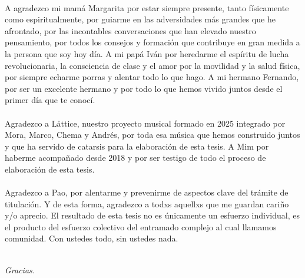 \\
A agradezco mi mamá Margarita por estar siempre presente, tanto físicamente como espiritualmente, por guiarme en las adversidades más grandes que he afrontado, por las incontables conversaciones que han elevado nuestro pensamiento, por todos los consejos y formación que contribuye en gran medida a la persona que soy hoy día. A mi papá Iván por heredarme el espíritu de lucha revolucionaria, la consciencia de clase y el amor por la movilidad y la salud física, por siempre echarme porras y alentar todo lo que hago. A mi hermano Fernando, por ser un excelente hermano y por todo lo que hemos vivido juntos desde el primer día que te conocí.\\
\\
Agradezco a Låttice, nuestro proyecto musical formado en 2025 integrado por Mora, Marco, Chema y Andrés, por toda esa música que hemos construido juntos y que ha servido de catarsis para la elaboración de esta tesis. A Mim por haberme acompañado desde 2018 y por ser testigo de todo el proceso de elaboración de esta tesis.\\
\\
Agradezco a Pao, por alentarme y prevenirme de aspectos clave del trámite de titulación. Y de esta forma, agradezco a todxs aquellxs que me guardan cariño y/o aprecio. El resultado de esta tesis no es únicamente un esfuerzo individual, es el producto del esfuerzo colectivo del entramado complejo al cual llamamos comunidad. Con ustedes todo, sin ustedes nada.\\
\\
\begin{flushright}%
\emph{Gracias.}
\end{flushright}